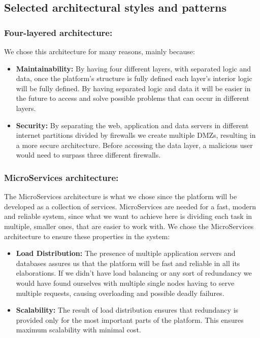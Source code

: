 \documentclass{article}
\begin{document}
{\newpage
\subsection{Selected architectural styles and patterns}
    \subsubsection{Four-layered architecture:} We chose this architecture for many reasons, mainly because:
    \begin{itemize}
        \item \textbf{Maintainability:} By having four different layers, with separated logic and data, once the platform's structure is fully defined
        each layer's interior logic will be fully defined.
        By having separated logic and data it will be easier in the future to access and solve possible problems that can occur in different 
        layers.
        \item \textbf{Security:} By separating the web, application and data servers in different internet partitions divided by firewalls we create multiple
        DMZs, resulting in a more secure architecture. Before accessing the data layer, a malicious user would need to surpass three different firewalls. 
    \end{itemize}
    \subsubsection{MicroServices architecture:} The MicroServices architecture is what we chose since the platform will be developed as a collection of 
    services. MicroServices are needed for a fast, modern and reliable system, since what we want to achieve here is dividing each task in multiple, 
    smaller ones, that are easier to work with.
    We chose the MicroServices architecture to ensure these properties in the system:
    \begin{itemize}
        \item \textbf{Load Distribution:} The presence of multiple application servers and databases assures us that the platform will be fast 
        and reliable in all its elaborations. If we didn't have load balancing or any sort of redundancy we would have found ourselves with multiple
        single nodes having to serve multiple requests, causing overloading and possible deadly failures.
        \item \textbf{Scalability:} The result of load distribution ensures that redundancy is provided only for the most important parts of the platform.
        This ensures maximum scalability with minimal cost.
    \end{itemize}
}
\end{document}
